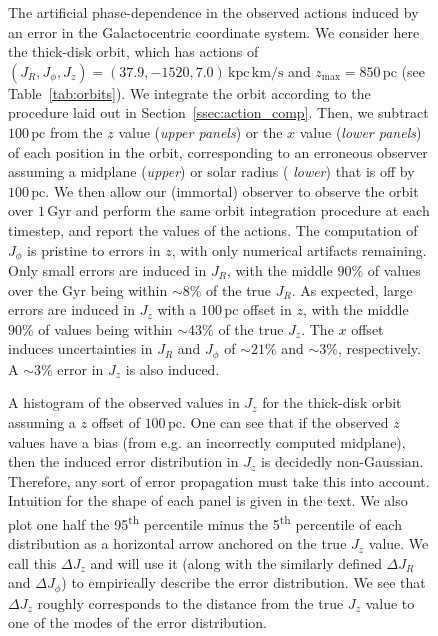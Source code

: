 \documentclass[twocolumn]{aastex62}
\newcommand{\pc}{\text{pc}}
\newcommand{\Gyr}{\text{Gyr}}
\newcommand{\kms}{\text{km}/\text{s}}
\newcommand{\actunit}{\text{kpc}\,\kms}
\newcommand{\uth}{\textsuperscript{th}}
\begin{document}
\begin{figure}
\caption{The artificial phase-dependence in the observed actions induced by an
error in the Galactocentric coordinate system. We consider here the thick-disk
orbit, which has actions of $(J_R, J_{\phi}, J_z) = (37.9, -1520, 7.0)\,\actunit$
and $z_{\text{max}}=850\,\pc$ (see Table~\ref{tab:orbits}). We integrate the
orbit according to the procedure laid out in Section~\ref{ssec:action_comp}.
Then, we subtract $100\,\pc$ from the $z$ value ({\em upper panels}) or the
$x$ value ({\em lower panels}) of each position in the orbit, corresponding to
an erroneous observer assuming a midplane ({\em upper}) or solar radius ({\em
lower}) that is off by $100\,\pc$. We then allow our (immortal) observer to
observe the orbit over $1\,\Gyr$ and perform the same orbit integration
procedure at each timestep, and report the values of the actions. The
computation of $J_{\phi}$ is pristine to errors in $z$, with only numerical
artifacts remaining. Only small errors are induced in $J_R$, with the middle
$90\%$ of values over the $\Gyr$ being within $\sim8\%$ of the true $J_R$. As
expected, large errors are induced in $J_z$ with a $100\,\pc$ offset in $z$,
with the middle $90\%$ of values being within $\sim43\%$ of the true $J_z$.
The $x$ offset induces uncertainties in $J_R$ and $J_{\phi}$ of $\sim21\%$ and
$\sim3\%$, respectively. A $\sim3\%$ error in $J_z$ is also induced.}
\label{fig:one_orbit_wrong_ref}
\end{figure}

\begin{figure}
\caption{A histogram of the observed values in $J_z$ for the thick-disk orbit
assuming a $z$ offset of $100\,\pc$. One can see that if the observed $z$
values have a bias (from e.g. an incorrectly computed midplane), then the
induced error distribution in $J_z$ is decidedly non-Gaussian. Therefore, any
sort of error propagation must take this into account. Intuition for the shape
of each panel is given in the text. We also plot one half the 95\uth{}
percentile minus the 5\uth{} percentile of each distribution as a horizontal
arrow anchored on the true $J_z$ value. We call this $\Delta J_z$ and will use
it (along with the similarly defined $\Delta J_R$ and $\Delta J_{\phi}$) to
empirically describe the error distribution. We see that $\Delta J_z$ roughly
corresponds to the distance from the true $J_z$ value to one of the modes of
the error distribution.}
\label{fig:Jz_hist}
\end{figure}
\end{document}
